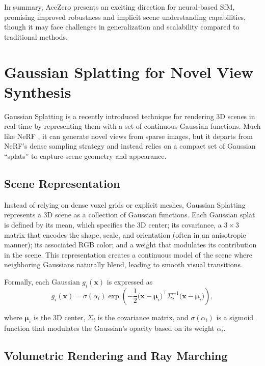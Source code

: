 In summary, AceZero presents an exciting direction for neural-based SfM, promising improved robustness and implicit scene understanding capabilities, though it may face challenges in generalization and scalability compared to traditional methods.

\section{Gaussian Splatting for Novel View Synthesis}\label{sec:gaussian_splatting}
Gaussian Splatting \cite{kerbl20233dgaussiansplattingrealtime} is a recently introduced technique for rendering 3D scenes in real time by representing them with a set of continuous Gaussian functions.
Much like NeRF \cite{mildenhall2020nerf}, it can generate novel views from sparse images, but it departs from NeRF's dense sampling strategy and instead relies on a compact set of Gaussian “splats” to capture scene geometry and appearance.

\subsection{Scene Representation}
Instead of relying on dense voxel grids or explicit meshes, Gaussian Splatting represents a 3D scene as a collection of Gaussian functions. 
Each Gaussian splat is defined by its mean, which specifies the 3D center; its covariance, a $3 \times 3$ matrix that encodes the shape, scale, and orientation (often in an anisotropic manner); its associated RGB color; and a weight that modulates its contribution in the scene. 
This representation creates a continuous model of the scene where neighboring Gaussians naturally blend, leading to smooth visual transitions.

Formally, each Gaussian $g_i(\mathbf{x})$ is expressed as
\begin{equation}
    g_i(\mathbf{x}) = \sigma(\alpha_i) \exp\left(-\frac{1}{2} \bigl(\mathbf{x} - \boldsymbol{\mu}_i\bigr)^\top \Sigma_i^{-1} \bigl(\mathbf{x} - \boldsymbol{\mu}_i\bigr)\right),
\end{equation}

where $\boldsymbol{\mu}_i$ is the 3D center, $\Sigma_i$ is the covariance matrix, and $\sigma(\alpha_i)$ is a sigmoid function that modulates the Gaussian's opacity based on its weight $\alpha_i$.

\subsection{Volumetric Rendering and Ray Marching}
